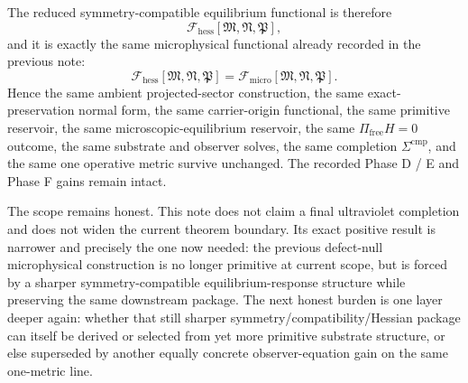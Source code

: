 \documentclass[11pt]{article}
\newcommand{\UltraFunctional}{\mathscr F_{\mathrm{micro}}}
\newcommand{\RootFunctional}{\mathscr F_{\mathrm{hess}}}
\newcommand{\UltraTensor}{\mathfrak M}
\newcommand{\UltraRelabel}{\mathfrak N}
\newcommand{\UltraFree}{\mathfrak P}
\begin{document}
The reduced symmetry-compatible equilibrium functional is therefore
\[
\RootFunctional[\UltraTensor,\UltraRelabel,\UltraFree],
\]
and it is exactly the same microphysical functional already recorded in the previous note:
\[
\RootFunctional[\UltraTensor,\UltraRelabel,\UltraFree]
=
\UltraFunctional[\UltraTensor,\UltraRelabel,\UltraFree].
\]
Hence the same ambient projected-sector construction, the same exact-preservation normal form, the same carrier-origin functional, the same primitive reservoir, the same microscopic-equilibrium reservoir, the same \(\Pi_{\mathrm{free}}H=0\) outcome, the same substrate and observer solves, the same completion \(\Sigma^{\mathrm{cmp}}\), and the same one operative metric survive unchanged. The recorded Phase D / E and Phase F gains remain intact.

The scope remains honest. This note does not claim a final ultraviolet completion and does not widen the current theorem boundary. Its exact positive result is narrower and precisely the one now needed: the previous defect-null microphysical construction is no longer primitive at current scope, but is forced by a sharper symmetry-compatible equilibrium-response structure while preserving the same downstream package. The next honest burden is one layer deeper again: whether that still sharper symmetry/compatibility/Hessian package can itself be derived or selected from yet more primitive substrate structure, or else superseded by another equally concrete observer-equation gain on the same one-metric line.
\end{document}
